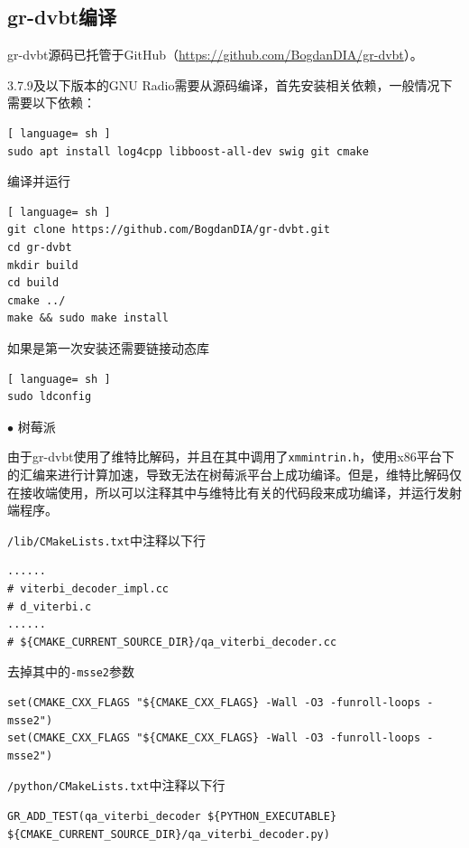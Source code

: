 		\subsection{gr-dvbt编译}
			\label{sec:gr-dvbt_compile}
			\par gr-dvbt源码已托管于GitHub（\href{https://github.com/BogdanDIA/gr-dvbt}{https://github.com/BogdanDIA/gr-dvbt}）。
			\par 3.7.9及以下版本的GNU Radio需要从源码编译，首先安装相关依赖，一般情况下需要以下依赖：
			\begin{lstlisting}[ language= sh ]
sudo apt install log4cpp libboost-all-dev swig git cmake
			\end{lstlisting}
			\par 编译并运行
			\begin{lstlisting}[ language= sh ]
git clone https://github.com/BogdanDIA/gr-dvbt.git
cd gr-dvbt
mkdir build
cd build
cmake ../
make && sudo make install
			\end{lstlisting}
			\par 如果是第一次安装还需要链接动态库
			\begin{lstlisting}[ language= sh ]
sudo ldconfig
			\end{lstlisting}
			\par\noindent $\bullet$ 树莓派
			\par 由于gr-dvbt使用了维特比解码，并且在其中调用了\lstinline{xmmintrin.h}，使用x86平台下的汇编来进行计算加速，导致无法在树莓派平台上成功编译。但是，维特比解码仅在接收端使用，所以可以注释其中与维特比有关的代码段来成功编译，并运行发射端程序。
			\par \lstinline{/lib/CMakeLists.txt}中注释以下行
			\begin{lstlisting}
......
# viterbi_decoder_impl.cc
# d_viterbi.c
......
# ${CMAKE_CURRENT_SOURCE_DIR}/qa_viterbi_decoder.cc

			\end{lstlisting}
			\par 去掉其中的\lstinline{-msse2}参数
			\begin{lstlisting}
set(CMAKE_CXX_FLAGS "${CMAKE_CXX_FLAGS} -Wall -O3 -funroll-loops -msse2")
set(CMAKE_CXX_FLAGS "${CMAKE_CXX_FLAGS} -Wall -O3 -funroll-loops -msse2")
			\end{lstlisting}
			\par \lstinline{/python/CMakeLists.txt}中注释以下行
			\begin{lstlisting}
GR_ADD_TEST(qa_viterbi_decoder ${PYTHON_EXECUTABLE} ${CMAKE_CURRENT_SOURCE_DIR}/qa_viterbi_decoder.py)
			\end{lstlisting}
